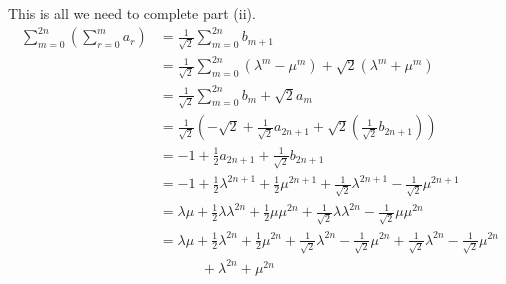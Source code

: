 \documentclass[a4paper]{article}
\begin{document}
This is all we need to complete part (ii).
\begin{align*}
    \sum_{m=0}^{2n} \left(\sum_{r=0}^{m} a_r\right) & = \frac{1}{\sqrt{2}} \sum_{m=0}^{2n} b_{m+1}                                                                                                                                                   \\
                                                    & = \frac{1}{\sqrt{2}} \sum_{m=0}^{2n} (\lambda^m - \mu^m) + \sqrt{2} (\lambda^m + \mu^m)                                                                                                        \\
                                                    & = \frac{1}{\sqrt{2}} \sum_{m=0}^{2n} b_m + \sqrt{2} a_m                                                                                                                                        \\
                                                    & = \frac{1}{\sqrt{2}} \left( -\sqrt{2} + \frac{1}{\sqrt{2}} a_{2n+1} + \sqrt{2} \left(\frac{1}{\sqrt{2}} b_{2n+1} \right) \right)                                                               \\
                                                    & = -1 + \frac{1}{2} a_{2n+1} + \frac{1}{\sqrt{2}} b_{2n+1}                                                                                                                                      \\
                                                    & = -1 + \frac{1}{2} \lambda^{2n+1} + \frac{1}{2} \mu^{2n+1} + \frac{1}{\sqrt{2}} \lambda^{2n+1} - \frac{1}{\sqrt{2}} \mu^{2n+1}                                                                 \\
                                                    & = \lambda\mu + \frac{1}{2} \lambda\lambda^{2n} + \frac{1}{2} \mu\mu^{2n} + \frac{1}{\sqrt{2}} \lambda\lambda^{2n} - \frac{1}{\sqrt{2}} \mu\mu^{2n}                                             \\
                                                    & = \lambda\mu + \frac{1}{2} \lambda^{2n} + \frac{1}{2} \mu^{2n} + \frac{1}{\sqrt{2}} \lambda^{2n} - \frac{1}{\sqrt{2}} \mu^{2n} + \frac{1}{\sqrt{2}} \lambda^{2n} - \frac{1}{\sqrt{2}} \mu^{2n} \\
                                                    & \phantom{++}\quad + \lambda^{2n} + \mu^{2n}                                                                                                                                                    \\

\end{align*}
\end{document}
